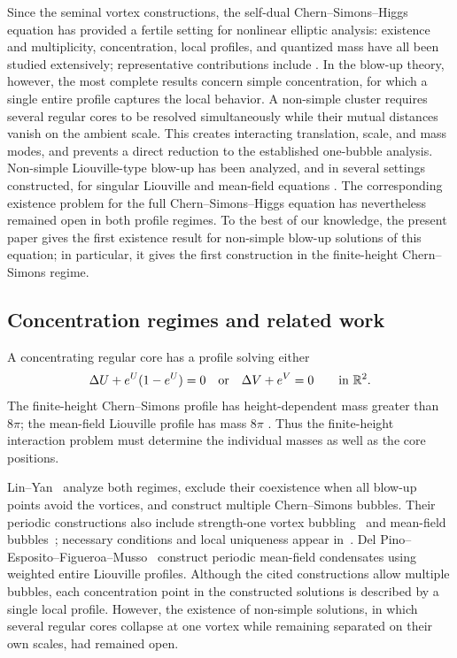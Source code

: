 \documentclass[11pt,reqno]{amsart}
\numberwithin{equation}{section}
\theoremstyle{definition}
\theoremstyle{remark}
\newcommand{\R}{\mathbb R}
\begin{document}
Since the seminal vortex constructions, the self-dual Chern--Simons--Higgs equation has provided a fertile setting for nonlinear elliptic analysis: existence and multiplicity, concentration, local profiles, and quantized mass have all been studied extensively; representative contributions include \cite{CaffarelliYang,Tarantello,CFL,ChoeKim,CKL,LinYanCMP,LinYanARMA,DelPinoEspositoFigueroaMusso,LinYanAIHP,LinYanAdvMath}. In the blow-up theory, however, the most complete results concern simple concentration, for which a single entire profile captures the local behavior. A non-simple cluster requires several regular cores to be resolved simultaneously while their mutual distances vanish on the ambient scale. This creates interacting translation, scale, and mass modes, and prevents a direct reduction to the established one-bubble analysis.  {Non-simple Liouville-type blow-up has been analyzed, and in several settings constructed, for singular Liouville and mean-field equations \cite{KuoLin,BartolucciTarantello,DAprileWeiZhangDCDS,DAprileWeiZhangCVPDE,DAprileWeiZhangAJM}. The corresponding existence problem for the full Chern--Simons--Higgs equation has nevertheless remained open in both profile regimes.} To the best of our knowledge, the present paper gives the first existence result for non-simple blow-up solutions of this equation; in particular, it gives the first construction in the finite-height Chern--Simons regime.  



 

\subsection{Concentration regimes and related work}

A concentrating regular core has a profile solving either
\[
 \Delta U+e^U(1-e^U)=0
 \quad\hbox{or}\quad \Delta V+e^V=0
 \qquad\hbox{in }\R^2.
\]
The finite-height Chern--Simons profile has height-dependent mass
greater than $8\pi$; the mean-field Liouville profile has mass $8\pi$
\cite{CFL,Choe,ChoeKim,CKL,LinYanAIHP}. Thus the finite-height
interaction problem must determine the individual masses as well
as the core positions.

Lin--Yan~\cite{LinYanAIHP} analyze both regimes, exclude their
coexistence when all blow-up points avoid the vortices, and construct
multiple Chern--Simons bubbles. Their periodic constructions also
include strength-one vortex bubbling~\cite{LinYanCMP} and
mean-field bubbles~\cite{LinYanARMA}; necessary conditions and local
uniqueness appear in~\cite{LinYanAdvMath}.
Del Pino--Esposito--Figueroa--Musso~\cite{DelPinoEspositoFigueroaMusso}
construct periodic mean-field condensates using weighted entire
Liouville profiles. Although the cited constructions allow multiple bubbles, each
concentration point in the constructed solutions is described by a
single local profile. However, the existence of non-simple solutions,
in which several regular cores collapse at one vortex while remaining
separated on their own scales, had remained open.
\end{document}
